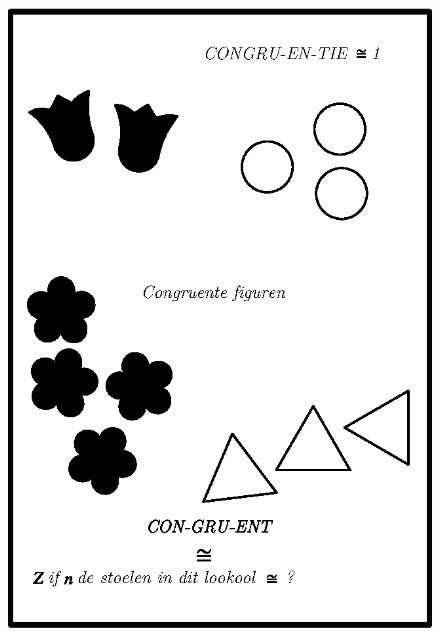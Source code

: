 \begin{figure}[H]
\centering
\includegraphics[scale=.7]{figure/fig_30.eps}
\caption{}\label{chap6-fig30}
\end{figure}

